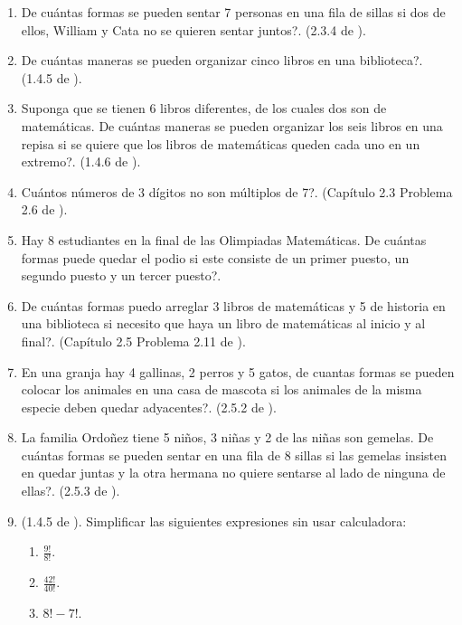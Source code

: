 \begin{enumerate}
	\item De cuántas formas se pueden sentar 7 personas en una fila de sillas si dos de ellos, William y Cata no se quieren sentar juntos?. (2.3.4 de \cite{ICP_Aops}).
	
	\item De cuántas maneras se pueden organizar cinco libros en una biblioteca?. (1.4.5 de \cite{ICP_Aops}).
	
	\item Suponga que se tienen 6 libros diferentes, de los cuales dos son de matemáticas. De cuántas maneras se pueden organizar los seis libros en una repisa si se quiere que los libros de matemáticas queden cada uno en un extremo?. (1.4.6 de \cite{ICP_Aops}).
	
	\item Cuántos números de 3 dígitos no son múltiplos de 7?. (Capítulo 2.3 Problema 2.6 de \cite{ICP_Aops}).
	
	\item Hay 8 estudiantes en la final de las Olimpiadas Matemáticas. De cuántas formas puede quedar el podio si este consiste de un primer puesto, un segundo puesto y un tercer puesto?.
	
	\item De cuántas formas puedo arreglar 3 libros de matemáticas y 5 de historia en una biblioteca si necesito que haya un libro de matemáticas al inicio y al final?. (Capítulo 2.5 Problema 2.11 de \cite{ICP_Aops}).
	
	\item En una granja hay 4 gallinas, 2 perros y 5 gatos, de cuantas formas se pueden colocar los animales en una casa de mascota si los animales de la misma especie deben quedar adyacentes?. (2.5.2 de \cite{ICP_Aops}).
	
	\item La familia Ordoñez tiene 5 niños, 3 niñas y 2 de las niñas son gemelas. De cuántas formas se pueden sentar en una fila de 8 sillas si las gemelas insisten en quedar juntas y la otra hermana no quiere sentarse al lado de ninguna de ellas?. (2.5.3 de \cite{ICP_Aops}).
	
	\item (1.4.5 de \cite{ICP_Aops}). Simplificar las siguientes expresiones sin usar calculadora: 
	\begin{enumerate}
		\item $\frac{9!}{8!}$.
		\item $\frac{42!}{40!}$.
		\item $8!-7!$.
	\end{enumerate}
	

\end{enumerate}

